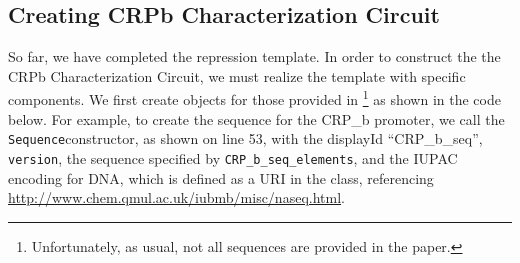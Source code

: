 \subsection*{Creating CRPb Characterization Circuit}
So far, we have completed the repression template. In order to construct the the CRPb Characterization Circuit, we must realize the template with specific components. We first create  objects for those provided in \cite{kiani2014crispr}\footnote{Unfortunately, as usual, not all sequences are provided in the paper.} as shown in the code below. For example, to create the sequence for the CRP\_b promoter, we call the \lstinline+Sequence+constructor, as shown on line 53, with the displayId ``CRP\_b\_seq'', \lstinline+version+, the sequence specified by \lstinline+CRP_b_seq_elements+, and the IUPAC encoding for DNA, which is defined as a URI in the  class, referencing \url{http://www.chem.qmul.ac.uk/iubmb/misc/naseq.html}.

